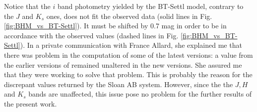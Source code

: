 Notice that the $i$ band photometry yielded by the BT-Settl model, contrary to the $J$ and $K_s$ ones, does not fit the observed data (solid lines in Fig. \ref{fig:BHM_vs_BT-Settl}). It must be shifted by 0.7 mag in order to be in accordance with the observed values (dashed lines in Fig. \ref{fig:BHM_vs_BT-Settl}). In a private communication with France Allard, she explained me that there was problem in the computation of some of the latest versions: a value from the earlier versions of \citet{1998A&A...337..403B} remained unaltered in the new versions. She assured me that they were working to solve that problem. This is probably the reason for the discrepant values returned by the Sloan AB system. However, since the the $J,H$ and $K_s$ bands are unaffected, this issue pose no problem for the further results of the present work. 

